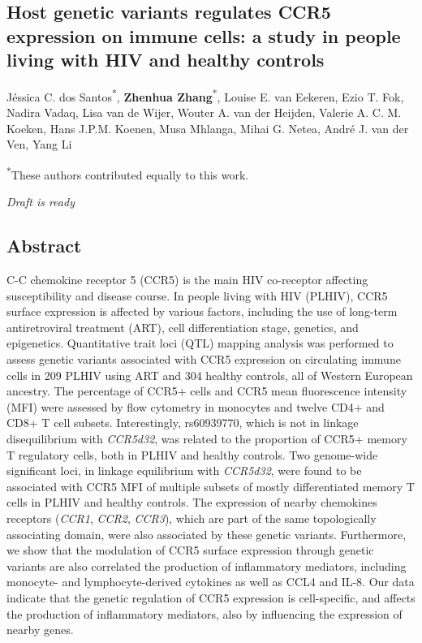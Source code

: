 \documentclass{book}
\begin{document}
\renewcommand{\thetable}{\textbf{Table \arabic{chapter}.\arabic{table}}}
\renewcommand{\thefigure}{\textbf{Figure \arabic{chapter}.\arabic{figure}}}

\begin{refsection} %

\chapter{Host genetic variants regulates CCR5 expression on immune cells: a study in people living with HIV and healthy controls}
Jéssica C. dos Santos\textsuperscript{*}, \textbf{Zhenhua Zhang}\textsuperscript{*}, Louise E. van Eekeren, Ezio T. Fok, Nadira Vadaq, Lisa van de Wijer, Wouter A. van der Heijden, Valerie A. C. M. Koeken, Hans J.P.M. Koenen, Musa Mhlanga, Mihai G. Netea, André J. van der Ven, Yang Li


\vfill
\begin{flushright}
  \textsuperscript{*}These authors contributed equally to this work. \par
  \textit{Draft is ready}
\end{flushright}


\clearpage
\newpage
\section*{Abstract}
C-C chemokine receptor 5 (CCR5) is the main HIV co-receptor affecting susceptibility and disease course.
In people living with HIV (PLHIV), CCR5 surface expression is affected by various factors, including the use of long-term antiretroviral treatment (ART), cell differentiation stage, genetics, and epigenetics.
Quantitative trait loci (QTL) mapping analysis was performed to assess genetic variants associated with CCR5 expression on circulating immune cells in 209 PLHIV using ART and 304 healthy controls, all of Western European ancestry.
The percentage of CCR5+ cells and CCR5 mean fluorescence intensity (MFI) were assessed by flow cytometry in monocytes and twelve CD4+ and CD8+ T cell subsets.
Interestingly, rs60939770, which is not in linkage disequilibrium with \textit{CCR5d32}, was related to the proportion of CCR5+ memory T regulatory cells, both in PLHIV and healthy controls.
Two genome-wide significant loci, in linkage equilibrium with \textit{CCR5d32}, were found to be associated with CCR5 MFI of multiple subsets of mostly differentiated memory T cells in PLHIV and healthy controls.
The expression of nearby chemokines receptors (\textit{CCR1}, \textit{CCR2}, \textit{CCR3}), which are part of the same topologically associating domain, were also associated by these genetic variants.
Furthermore, we show that the modulation of CCR5 surface expression through genetic variants are also correlated the production of inflammatory mediators, including monocyte- and lymphocyte-derived cytokines as well as CCL4 and IL-8.
Our data indicate that the genetic regulation of CCR5 expression is cell-specific, and affects the production of inflammatory mediators, also by influencing the expression of nearby genes.



\end{refsection}
\end{document}

